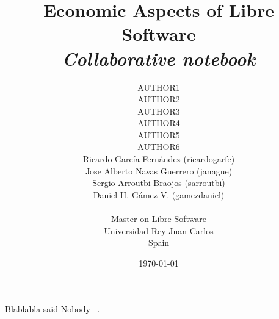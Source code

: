 \documentclass[10pt,a4paper,final]{report}
\title{\textbf{Economic Aspects of Libre Software}\\
		\emph{Collaborative notebook}}
\author{AUTHOR1\\
		AUTHOR2\\
		AUTHOR3\\
		AUTHOR4\\
		AUTHOR5\\
		AUTHOR6\\
		Ricardo Garc\'ia Fern\'andez (ricardogarfe)\\
		Jose Alberto Navas Guerrero (janague)\\
		Sergio Arroutbi Braojos (sarroutbi)\\
		Daniel H. G\'amez V. (gamezdaniel)\\
        \\Master on Libre Software\\
        Universidad Rey Juan Carlos\\
        Spain	\\
		}
\date{\today}
\begin{document}
\maketitle


\tableofcontents










Blablabla said Nobody ~\cite{Nobody06}.




\end{document}
